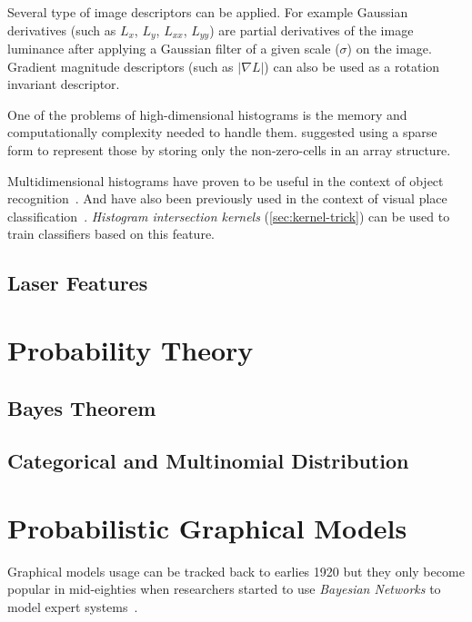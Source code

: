 Several type of image descriptors can be applied.
For example Gaussian derivatives (such as $L_x$, $L_y$, $L_{xx}$, $L_{yy}$) are
partial derivatives of the image luminance after applying a Gaussian filter of a
given scale ($\sigma$) on the image. Gradient magnitude descriptors
(such as $|\nabla L|$) can also be used as a rotation invariant descriptor.


One of the problems of high-dimensional histograms is the memory and
computationally complexity needed to handle them.
\cite{linde2004object} suggested using a sparse form to represent those by
storing only the non-zero-cells in an array structure.

Multidimensional histograms have proven to be useful in the context of object
recognition~\citep{schiele1996object}. And have also been previously used in
the context of visual place classification~\cite{pronobis2010ijrr}.
\emph{Histogram intersection kernels} (\autoref{sec:kernel-trick}) can be used
to train classifiers based on this feature.

\subsection{Laser Features}


\clearpage
\section{Probability Theory}
\subsection{Bayes Theorem}

\subsection{Categorical and Multinomial Distribution}

\section{Probabilistic Graphical Models}
\label{sec:graphical-models}
Graphical models usage can be tracked back to earlies 1920 but they only become
popular in mid-eighties when researchers started to use \emph{Bayesian Networks}
to model expert systems~\citep{borgelt2002graphical}.

